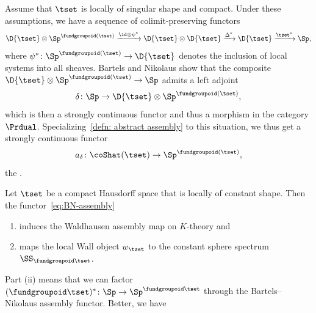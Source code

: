 \medskip

Assume that $\tset$ is locally of singular shape and compact. Under these assumptions, we have a sequence of colimit-preserving functors
\[
  \D{\tset}\otimes\Sp^{\fundgroupoid (\tset )}\xrightarrow{\id\otimes\psi^*}
  \D{\tset}\otimes \D{\tset}\xrightarrow{\Delta^*}\D{\tset}\xrightarrow{\tset^*}
  \Sp, 
\]
where $\psi^*\colon \Sp^{\fundgroupoid (\tset )}\to\D{\tset}$ denotes the inclusion of local systems into all sheaves. Bartels and Nikolaus show that the composite $\D{\tset}\otimes\Sp^{\fundgroupoid (\tset )}\to\Sp$ admits a left adjoint
\[
\delta\colon \Sp\to \D{\tset}\otimes\Sp^{\fundgroupoid (\tset )},
\]
which is then a strongly continuous functor and thus a morphism in the category $\Prdual$. Specializing~\cref{defn: abstract assembly} to this situation, we thus get a strongly continuous functor
\begin{equation}
  \label{eq:BN-assembly}
  a_\delta\colon\coShat (\tset )\to \Sp^{\fundgroupoid (\tset )},
\end{equation}
the .
\begin{thm}\label{thm: Bartels--Nikolaus geometric topology}
  Let $\tset$ be a compact Hausdorff space that is locally of constant shape.
  Then the functor~\eqref{eq:BN-assembly}
  \begin{enumerate}[label=(\roman*)]
  \item induces the Waldhausen assembly map on $K$-theory and
  \item maps the local Wall object $w_\tset$ to the constant sphere spectrum $\SS_{\fundgroupoid \tset}$.
  \end{enumerate}
\end{thm}
Part (ii) means that we can factor $(\fundgroupoid\tset )^*\colon\Sp\to\Sp^{\fundgroupoid\tset}$ through the Bartels--Nikolaus assembly functor. Better, we have
